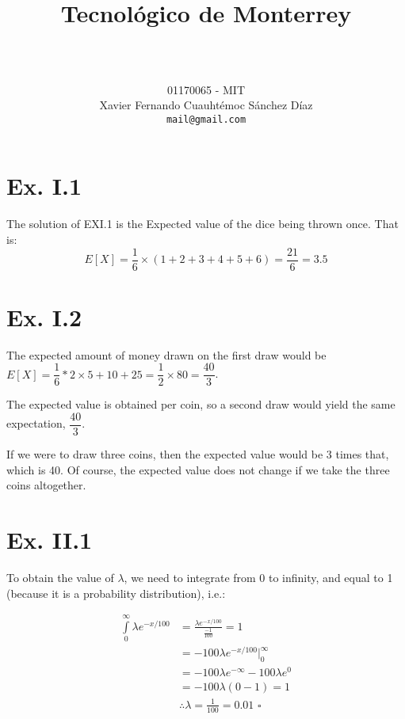 \documentclass[titlepage, letterpaper]{article}
\title{
\vspace{1in}
\textbf{Tecnológico de Monterrey} \\
\vspace{0.5in}
\textmd{\mahclass} \\
\vspace{0.5in}
\textsc{\mahtitle}
\author{01170065  - MIT \\
Xavier Fernando Cuauhtémoc Sánchez Díaz \\
\texttt{mail@gmail.com}}
\date{\mahdate}
}
\newcommand{\qed}{\,\,\square}
\begin{document}
\begin{titlepage}
    \maketitle
\end{titlepage}

%
%

\section{Ex. I.1} %
\label{sec:exercise_i_1}

The solution of EXI.1 is the Expected value of the dice being thrown once.
That is:
$$E[X] = \frac{1}{6} \times (1+2+3+4+5+6) = \frac{21}{6} = 3.5$$


\section{Ex. I.2} %
\label{sec:ex_i_2}

The expected amount of money drawn on the first draw would be $E[X] = \dfrac{1}{6} * 2 \times 5+10+25 = \dfrac{1}{2} \times 80 = \dfrac{40}{3}$.

The expected value is obtained per coin, so a second draw would yield the same expectation, $\dfrac{40}{3}$.

If we were to draw three coins, then the expected value would be 3 times that, which is 40.
Of course, the expected value does not change if we take the three coins altogether.


\section{Ex. II.1} %
\label{sec:ex_ii_1}

To obtain the value of $\lambda$, we need to integrate from 0 to infinity, and equal to 1 (because it is a probability distribution), i.e.:

\begin{align}
    \int\limits_0^\infty \lambda e^{-x/100} & = \frac{\lambda e^{-x/100}}{\tfrac{-1}{100}} = 1 \\
    & = -100\lambda e^{-x/100}\Big|_0^\infty \\[3ex]
    & = -100\lambda e^{-\infty} - 100\lambda e^0 \\
    & = -100\lambda (0 - 1) = 1 \\
    & \therefore \lambda = \frac{1}{100} = 0.01 \qed
\end{align}
\end{document}
